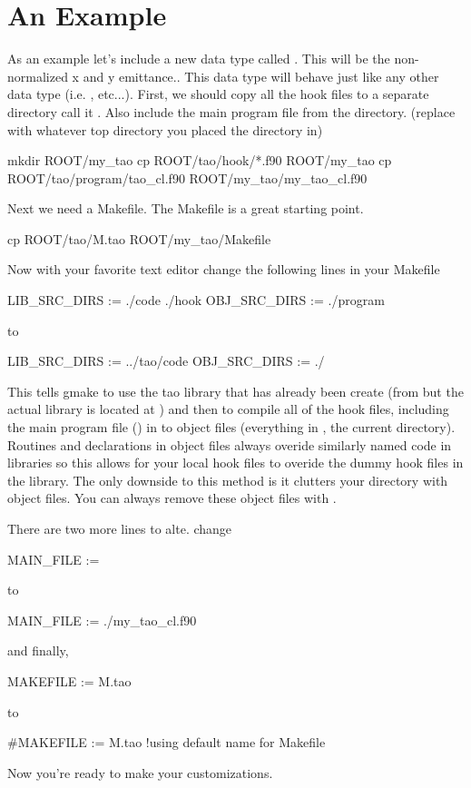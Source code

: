 \section{An Example}

As an example let's include a new data type called . This
will be the non-normalized x and y emittance.. This
data type will behave just like any other data type (i.e. , 
etc...). First, we should copy all the hook files to a separate directory call
it . Also include the main program file from the
 directory.
(replace  with whatever top directory you placed
the  directory in)
\begin{example}
  mkdir ROOT/my_tao
  cp ROOT/tao/hook/*.f90 ROOT/my_tao
  cp ROOT/tao/program/tao_cl.f90 ROOT/my_tao/my_tao_cl.f90
\end{example}
Next we need a Makefile. The  
Makefile is a great starting point.
\begin{example}
  cp ROOT/tao/M.tao ROOT/my_tao/Makefile
\end{example}
Now with your favorite text editor change the following lines in your Makefile
\begin{example}
  LIB\_SRC\_DIRS := ./code ./hook
  OBJ\_SRC\_DIRS := ./program
\end{example}
to
\begin{example}
  LIB\_SRC\_DIRS := ../tao/code
  OBJ\_SRC\_DIRS := ./
\end{example}
This tells gmake to use the tao library that has already been create (from 
 but the actual library is located at )
 and then to compile
all of the hook files, including the main program file () in
to object files (everything in , the current directory).
 Routines and declarations in object files always overide similarly named code in
libraries so this allows for your local hook files to overide the dummy hook
files in the \tao library. The only downside to this method is it clutters your
 directory with object files. You can always remove these object files
with .

There are two more lines to alte. change
\begin{example}
  MAIN\_FILE :=
\end{example}
to
\begin{example}
  MAIN\_FILE := ./my\_tao_cl.f90
\end{example}
and finally,
\begin{example}
  MAKEFILE := M.tao
\end{example}
to
\begin{example}
  #MAKEFILE := M.tao !using default name for Makefile
\end{example}
Now you're ready to make your customizations.

